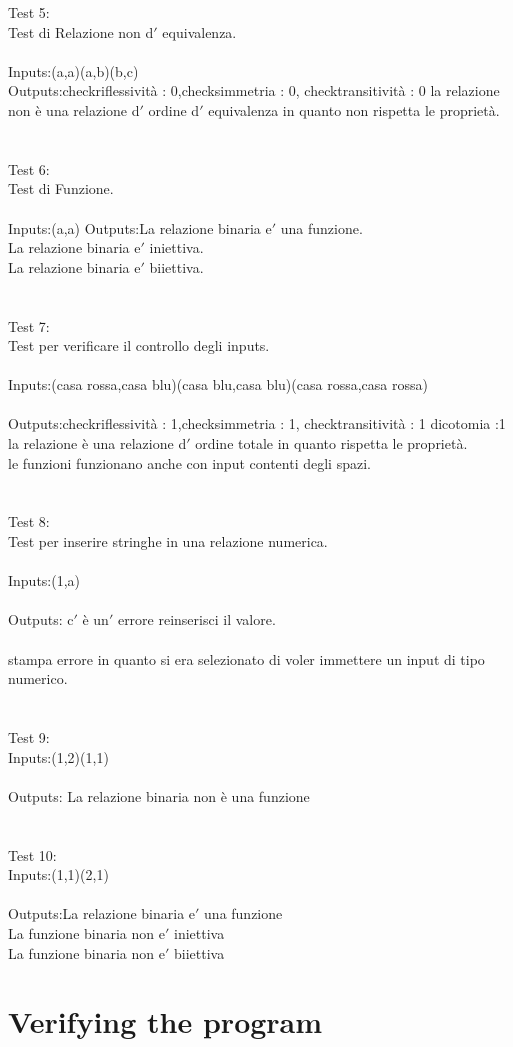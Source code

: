 \documentclass[11pt, a4paper, titlepage, block]{article}
\begin{document}
	Test 5:\\
	Test di Relazione non d$'$ equivalenza.\\
	\\
	Inputs:(a,a)(a,b)(b,c)\\
	Outputs:checkriflessivit\`a : 0,checksimmetria : 0, checktransitivit\`a : 0
	la relazione non \`e una relazione d$'$ ordine d$'$ equivalenza in quanto non rispetta le propriet\`a.\\
	\\
	\\
	Test 6:\\
	Test di Funzione.\\
	\\
	Inputs:(a,a)
	Outputs:La relazione binaria e$'$  una funzione.\\
	La relazione binaria e$'$  iniettiva.\\
	La relazione binaria e$'$  biiettiva.\\
	\\
	\\
	Test 7:\\
	Test per verificare il controllo degli inputs.\\
	\\
	Inputs:(casa rossa,casa blu)(casa blu,casa blu)(casa rossa,casa rossa)\\
	\\
	Outputs:check\textunderscore riflessivit\`a : 1,check\textunderscore simmetria : 1, check\textunderscore transitivit\`a : 1 dicotomia :1
	la relazione \`e una relazione d$'$ ordine totale in quanto rispetta le propriet\`a.\\
	le funzioni funzionano anche con input contenti degli spazi.\\
	\\
	\\
	Test 8:\\
	Test per inserire stringhe in una relazione numerica.\\
	\\
	Inputs:(1,a)\\
	\\
	Outputs: c$'$ \`e un$'$ errore reinserisci il valore.\\
	\\
	stampa errore in quanto si era selezionato di voler immettere un input di tipo numerico.\\
	\\
	\\
	\newpage
	Test 9:\\
	Inputs:(1,2)(1,1)\\
	\\
	Outputs: La relazione binaria non \`e una funzione\\
	\\
	\\
	Test 10:\\
	Inputs:(1,1)(2,1)\\
	\\
	Outputs:La relazione binaria e$'$  una funzione\\
	La funzione binaria non e$'$  iniettiva\\
	La funzione binaria non e$'$  biiettiva\\
	\newpage
	\section{Verifying the program}
	
	
	
	
	
	
\end{document}

